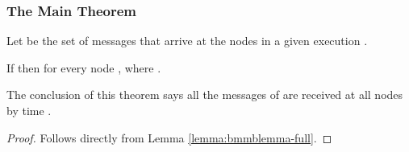 \subsubsection{The Main Theorem}

Let  be the set of messages that arrive at the nodes in a given execution .


\begin{theorem}
\label{thm:bmmb:time-full}
If  then  for every node ,
where .
\end{theorem}
The conclusion of this theorem says all the messages of  are received at all
nodes by time .
\begin{proof}
Follows directly from Lemma \ref{lemma:bmmblemma-full}.
\end{proof}













